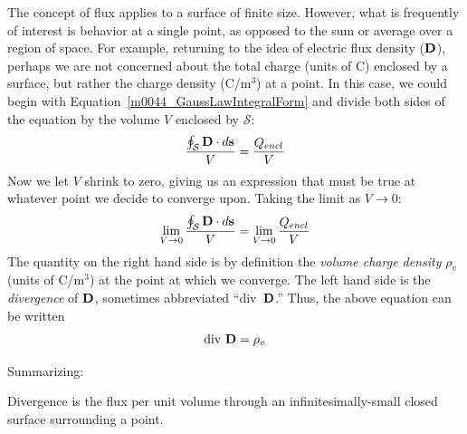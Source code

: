The concept of flux applies to a surface of finite size. 
However, what is frequently of interest is behavior at a single point, as opposed to the sum or average over a region of space.
For example, returning to the idea of electric flux density (${\bf D}$), perhaps we are not concerned about the total charge (units of C) enclosed by a surface, but rather the charge density (C/m$^3$) at a point.
In this case, we could begin with Equation~\ref{m0044_GaussLawIntegralForm} and divide both sides of the equation by the volume $V$ enclosed by ${\mathcal S}$:
%
\begin{equation}   
\frac{\oint_{\mathcal S}{ {\bf D} \cdot d{\bf s} } }{V} = \frac{ Q_{encl} }{V}
\end{equation}
%
Now we let $V$ shrink to zero, giving us an expression that must be true at whatever point we decide to converge upon.
Taking the limit as $V \to 0$:
%
\begin{equation}   
\lim_{V \to 0} \frac{ \oint_{\mathcal S}{ {\bf D} \cdot d{\bf s} } }{V} = \lim_{V \to 0} \frac{ Q_{encl} }{V}
\end{equation}
%
The quantity on the right hand side is by definition the \emph{volume charge density}
$\rho_v$ (units of C/m$^3$) at the point at which we converge.  The left hand side is the {\it divergence} of ${\bf D}$, sometimes abbreviated ``div~${\bf D}$.''
Thus, the above equation can be written 
%
\begin{equation}
\mbox{div}~{\bf D} = \rho_v
\end{equation}

Summarizing:
\begin{mdframed}[backgroundcolor=yellow!20,nobreak=true] 
Divergence 
is the flux per unit volume through an infinitesimally-small closed surface surrounding a point. 
\end{mdframed}

